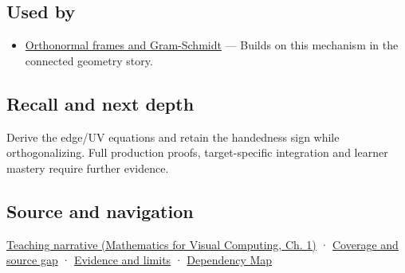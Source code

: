 \subsection{Used by}\label{appendix-e31893dec985-used-by}

\hypertarget{appendix-e31893dec985-used-by}{}

\begin{itemize}
\tightlist
\item
  \hyperref[appendix-c39f1ed34271]{Orthonormal frames and Gram-Schmidt} --- Builds on this mechanism in the connected geometry story.
\end{itemize}

\subsection{Recall and next depth}\label{appendix-e31893dec985-recall-and-next-depth}

\hypertarget{appendix-e31893dec985-recall-and-next-depth}{}

Derive the edge/UV equations and retain the handedness sign while orthogonalizing. Full production proofs, target-specific integration and learner mastery require further evidence.

\subsection{Source and navigation}\label{appendix-e31893dec985-source-and-navigation}

\hypertarget{appendix-e31893dec985-source-and-navigation}{}

\href{../02-Mathematics-for-Visual-Computing/main.pdf\#nameddest=01-foundations-i-ch017-surface-movement-becomes-a-local-frame}{Teaching narrative (Mathematics for Visual Computing, Ch. 1)} · \hyperref[appendix-fd090d982a15-phase-6---parts-501-600]{Coverage and source gap} · \hyperref[appendix-a103e7846d21-phase-6---source-analysis-and-verification]{Evidence and limits} · \hyperref[appendix-4ad47bdd269a]{Dependency Map}
